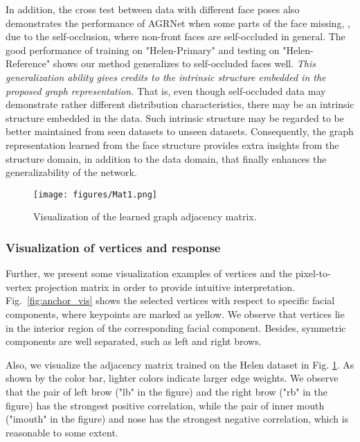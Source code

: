 In addition, the cross test between data with different face poses also demonstrates the performance of AGRNet when some parts of the face missing, \eg, due to the self-occlusion, where non-front faces are self-occluded in general. The good performance of training on "Helen-Primary" and testing on "Helen-Reference" shows our method generalizes to self-occluded faces well. 
\textit{This generalization ability gives credits to the intrinsic structure embedded in the proposed graph representation.} That is, even though self-occluded data may demonstrate rather different distribution characteristics, there may be an intrinsic structure embedded in the data. Such intrinsic structure may be regarded to be better maintained from seen datasets to unseen datasets. Consequently, the graph representation learned from the face structure provides extra insights from the structure domain, in addition to the data domain, that finally enhances the generalizability of the network. 

\begin{figure}[t]
    \centering
    \texttt{[image: figures/Mat1.png]}
    \vspace{-0.2cm}
    \caption{Visualization of the learned graph adjacency matrix.}
    \label{fig:graph}
\end{figure}

\subsubsection{Visualization of vertices and response}

Further, we present some visualization examples of vertices and the pixel-to-vertex projection matrix in order to provide intuitive interpretation. Fig.~\ref{fig:anchor_vis} shows the selected vertices with respect to specific facial components, where keypoints are marked as yellow. 
We observe that vertices lie in the interior region of the corresponding facial component. 
Besides, symmetric components are well separated, such as left and right brows. 

Also, we visualize the adjacency matrix trained on the Helen dataset in Fig. \ref{fig:graph}. As shown by the color bar, lighter colors indicate larger edge weights. 
We observe that the pair of left brow ("lb" in the figure) and the right brow ("rb" in the figure) has the strongest positive correlation, while the pair of inner mouth ("imouth" in the figure) and nose has the strongest negative correlation, which is reasonable to some extent.  

